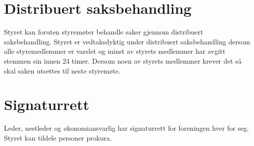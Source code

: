 \section{Distribuert saksbehandling}
Styret kan foruten styremøter behandle saker gjennom distribuert saksbehandling. Styret er vedtaksdyktig under distribuert saksbehandling dersom alle styremedlemmer er varslet og minst  av styrets medlemmer har avgitt stemmen sin innen 24 timer. Dersom noen av styrets medlemmer krever det så skal saken utsettes til neste styremøte.

\section{Signaturrett}
Leder, nestleder og økonomiansvarlig har signaturrett for foreningen hver for seg. Styret kan tildele personer prokura.

